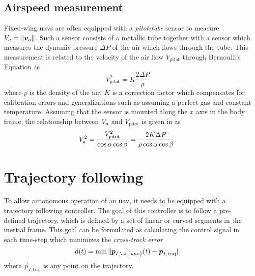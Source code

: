\subsection{Airspeed measurement}\label{sec:measure_airspd}
Fixed-wing \acp{uav} are often equipped with a \textit{pitot-tube} sensor to measure $V_a=\|\boldsymbol{v}_a\|$.
Such a sensor consists of a metallic tube together with a sensor which measures the dynamic pressure $\Delta P$ of 
the air which flows through the tube. This measurement is related to the velocity of the air flow $V_{\text{pitot}}$ through 
Bernoulli's Equation as 
\begin{equation}
    V^2_{\text{pitot}} = K\frac{2\Delta P}{\rho}
\end{equation}
where $\rho$ is the density of the air. $K$ is a correction factor which compensates for calibration errors and 
generalizations such as assuming a perfect gas and constant temperature. Assuming that the sensor is mounted 
along the $x$ axis in the body frame, the relationship between $V_a$ and $V_{\text{pitot}}$ is given in \cite{pitot} as
\begin{equation}
    V_a^2=\frac{V^2_{\text{pitot}}}{\cos\alpha\cos\beta}=\frac{2K\Delta P}{\rho\cos\alpha\cos\beta}.
\end{equation}  

\section{Trajectory following}
To allow autonomous operation of an \ac{uav}, it needs to be equipped with a trajectory following controller.
The goal of this controller is to follow a pre-defined trajectory, which is defined by a set of 
linear or curved segments in the inertial frame. This goal can be formulated as calculating the control signal 
in each time-step which minimizes the \textit{cross-track error}
\begin{equation}
    d(t)=\min\|\vec{p}_{I,\ac{uav}}(t)-\vec{p}_{I,\text{traj}}\|
\end{equation}
where $\vec{p}_{I,\text{traj}}$ is any point on the trajectory. 


